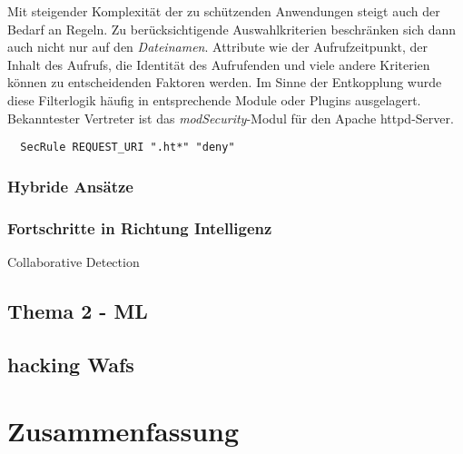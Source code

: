 Mit steigender Komplexität der zu schützenden Anwendungen steigt auch der Bedarf an Regeln. Zu berücksichtigende Auswahlkriterien beschränken sich dann auch nicht nur auf den \glqq\emph{Dateinamen}\grqq. Attribute wie der Aufrufzeitpunkt, der Inhalt des Aufrufs, die Identität des Aufrufenden und viele andere Kriterien können zu entscheidenden Faktoren werden. Im Sinne der Entkopplung wurde diese Filterlogik häufig in entsprechende Module oder Plugins ausgelagert. Bekanntester Vertreter ist das \emph{modSecurity}-Modul für den Apache httpd-Server.

\begin{lstlisting}
  SecRule REQUEST_URI ".ht*" "deny"
\end{lstlisting}


\subsubsection{Hybride Ansätze}


\subsubsection{Fortschritte in Richtung Intelligenz}

Collaborative Detection \cite{karakannas2014}


\subsection{Thema 2 - ML}


\subsection{hacking Wafs}


\section{Zusammenfassung}

